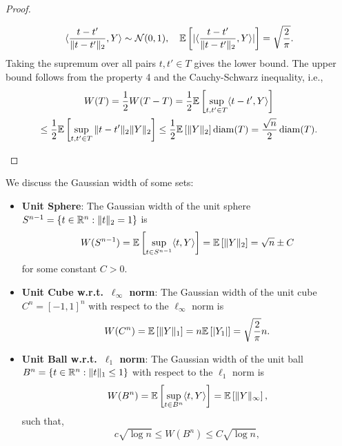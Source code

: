 \begin{proof}
\begin{enumerate}
		      \begin{equation*}
			      \langle \frac{t-t'}{\|t-t'\|_{2}},Y\rangle\sim\mathcal{N}(0,1),\quad \mathbb{E}\left[|\langle \frac{t-t'}{\|t-t'\|_{2}},Y\rangle|\right]=\sqrt{\frac{2}{\pi}}.
		      \end{equation*}
		      Taking the supremum over all pairs \(t,t'\in T\) gives the lower bound. The upper bound follows from the property 4 and the Cauchy-Schwarz inequality, i.e.,
		      \begin{multline*}
			      W(T)=\frac{1}{2}W(T-T)=\frac{1}{2}\mathbb{E}\left[\sup_{t,t'\in T}\langle t-t',Y\rangle\right]\\
			      \leq\frac{1}{2}\mathbb{E}\left[\sup_{t,t'\in T}\|t-t'\|_{2}\|Y\|_{2}\right]\leq\frac{1}{2}\mathbb{E}\left[\|Y\|_{2}\right]\operatorname{diam}(T)=\frac{\sqrt{n}}{2}\operatorname{diam}(T).
		      \end{multline*}
	\end{enumerate}
\end{proof}

\begin{example}
	We discuss the Gaussian width of some sets:
	\begin{itemize}
		\item \textbf{Unit Sphere}: The Gaussian width of the unit sphere \(S^{n-1}=\{t\in\mathbb{R}^{n}:\|t\|_{2}=1\}\) is
		      \begin{equation*}
			      W(S^{n-1})=\mathbb{E}\left[\sup_{t\in S^{n-1}}\langle t,Y\rangle\right]=\mathbb{E}\left[\|Y\|_{2}\right]=\sqrt{n}\pm C
		      \end{equation*}
		      for some constant \(C>0\).
		\item \textbf{Unit Cube w.r.t.\ \(\ell_{\infty}\) norm}: The Gaussian width of the unit cube \(C^{n}=[-1,1]^{n}\) with respect to the \(\ell_{\infty}\) norm is
		      \begin{equation*}
			      W(C^{n})=\mathbb{E}\left[\|Y\|_{1}\right]=n\mathbb{E}\left[|Y_{1}|\right]=\sqrt{\frac{2}{\pi}}n.
		      \end{equation*}
		\item \textbf{Unit Ball w.r.t.\ \(\ell_{1}\) norm}: The Gaussian width of the unit ball \(B^{n}=\{t\in\mathbb{R}^{n}:\|t\|_{1}\leq 1\}\) with respect to the \(\ell_{1}\) norm is
		      \begin{equation*}
			      W(B^{n})=\mathbb{E}\left[\sup_{t\in B^{n}}\langle t,Y\rangle\right]=\mathbb{E}\left[\|Y\|_{\infty}\right],
		      \end{equation*}
		      such that,
		      \begin{equation*}
			      c\sqrt{\log n}\leq W(B^{n})\leq C\sqrt{\log n},
		      \end{equation*}
	\end{itemize}
\end{example}

